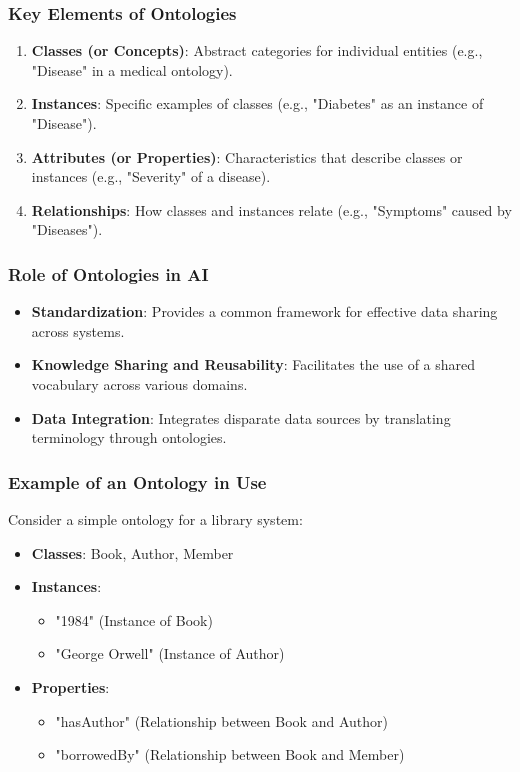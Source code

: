 \documentclass[aspectratio=169]{beamer}
\begin{document}
\begin{frame}[fragile]
    \frametitle{Key Elements of Ontologies}
    \begin{enumerate}
        \item \textbf{Classes (or Concepts)}: Abstract categories for individual entities (e.g., "Disease" in a medical ontology).
        \item \textbf{Instances}: Specific examples of classes (e.g., "Diabetes" as an instance of "Disease").
        \item \textbf{Attributes (or Properties)}: Characteristics that describe classes or instances (e.g., "Severity" of a disease).
        \item \textbf{Relationships}: How classes and instances relate (e.g., "Symptoms" caused by "Diseases").
    \end{enumerate}
\end{frame}

\begin{frame}[fragile]
    \frametitle{Role of Ontologies in AI}
    \begin{itemize}
        \item \textbf{Standardization}: Provides a common framework for effective data sharing across systems.
        \item \textbf{Knowledge Sharing and Reusability}: Facilitates the use of a shared vocabulary across various domains.
        \item \textbf{Data Integration}: Integrates disparate data sources by translating terminology through ontologies.
    \end{itemize}
\end{frame}

\begin{frame}[fragile]
    \frametitle{Example of an Ontology in Use}
    Consider a simple ontology for a library system:
    \begin{itemize}
        \item \textbf{Classes}: Book, Author, Member
        \item \textbf{Instances}:
        \begin{itemize}
            \item "1984" (Instance of Book)
            \item "George Orwell" (Instance of Author)
        \end{itemize}
        \item \textbf{Properties}:
        \begin{itemize}
            \item "hasAuthor" (Relationship between Book and Author)
            \item "borrowedBy" (Relationship between Book and Member)
        \end{itemize}
    \end{itemize}
\end{frame}
\end{document}
